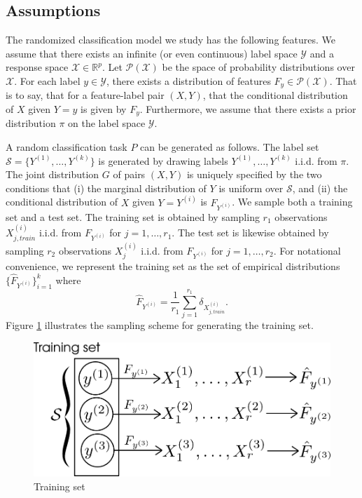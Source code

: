 \subsection{Assumptions}

The randomized classification model we study has the following
features.  We assume that there exists an infinite (or even
continuous) label space $\mathcal{Y}$ and a response space
$\mathcal{X} \in \mathbb{R}^p$.  Let $\mathcal{P}(\mathcal{X})$ be the space of probability distributions over $\mathcal{X}$. For each label $y \in \mathcal{Y}$,
there exists a distribution of features $F_y \in \mathcal{P}(\mathcal{X})$.  That is to say, that
for a feature-label pair $(X, Y)$, that the conditional distribution
of $X$ given $Y = y$ is given by $F_y$.  Furthermore, we assume that
there exists a prior distribution $\pi$ on the label space $\mathcal{Y}$.

A random classification task $P$ can be generated as follows.  The
label set $\mathcal{S} = \{Y^{(1)},\hdots, Y^{(k)}\}$ is generated by
drawing labels $Y^{(1)},\hdots, Y^{(k)}$ i.i.d. from $\pi$.  The joint
distribution $G$ of pairs $(X, Y)$ is uniquely specified by the two
conditions that (i) the marginal distribution of $Y$ is uniform over
$\mathcal{S}$, and (ii) the conditional distribution of $X$ given
$Y=Y^{(i)}$ is $F_{Y^{(i)}}$.  We sample both a training set and a
test set.  The training set is obtained by sampling $r_1$ observations
$X_{j, train}^{(i)}$ i.i.d. from $F_{Y^{(i)}}$ for $j = 1,\hdots,
r_1$.  The test set is likewise obtained by sampling $r_2$
observations $X_j^{(i)}$ i.i.d. from $F_{Y^{(i)}}$ for $j = 1,\hdots,
r_2$.  For notational convenience, we represent the training set as
the set of empirical distributions $\{\hat{F}_{Y^{(i)}}\}_{i=1}^k$
where
\[
\hat{F}_{Y^{(i)}} = \frac{1}{r_1} \sum_{j=1}^{r_1} \delta_{X^{(i)}_{j, train}}.
\]
Figure \ref{fig:training_set} illustrates the sampling scheme for
generating the training set.

\begin{figure}[h]
\centering
\includegraphics[scale = 0.4]{../extrapolation_figures/training_set.png}
\caption{Training set}\label{fig:training_set}
\end{figure}

